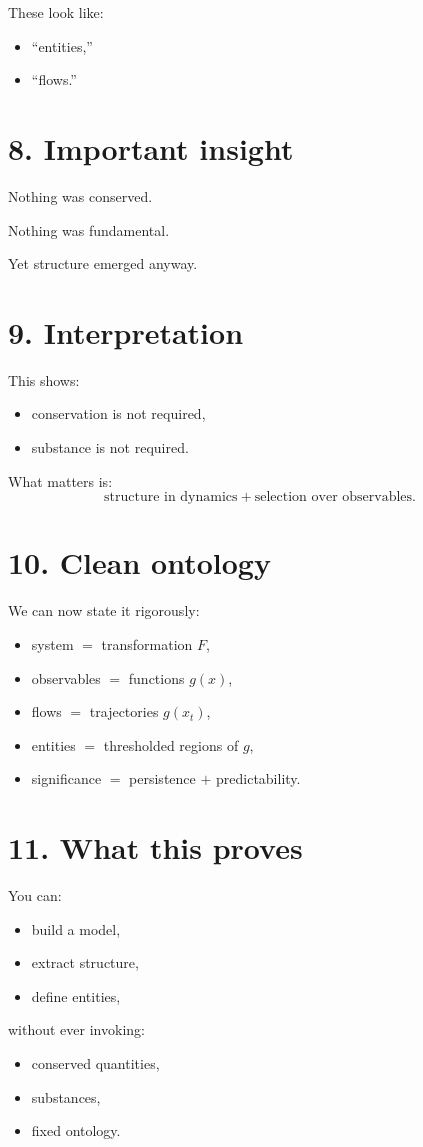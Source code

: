 \documentclass[11pt]{article}
\begin{document}
These look like:
\begin{itemize}[leftmargin=2em]
    \item ``entities,''
    \item ``flows.''
\end{itemize}

\section*{8. Important insight}

Nothing was conserved.

Nothing was fundamental.

Yet structure emerged anyway.

\section*{9. Interpretation}

This shows:
\begin{itemize}[leftmargin=2em]
    \item conservation is not required,
    \item substance is not required.
\end{itemize}

What matters is:
\[
\text{structure in dynamics} + \text{selection over observables}.
\]

\section*{10. Clean ontology}

We can now state it rigorously:
\begin{itemize}[leftmargin=2em]
    \item system \(=\) transformation \(F\),
    \item observables \(=\) functions \(g(x)\),
    \item flows \(=\) trajectories \(g(x_t)\),
    \item entities \(=\) thresholded regions of \(g\),
    \item significance \(=\) persistence \(+\) predictability.
\end{itemize}

\section*{11. What this proves}

You can:
\begin{itemize}[leftmargin=2em]
    \item build a model,
    \item extract structure,
    \item define entities,
\end{itemize}
without ever invoking:
\begin{itemize}[leftmargin=2em]
    \item conserved quantities,
    \item substances,
    \item fixed ontology.
\end{itemize}
\end{document}
